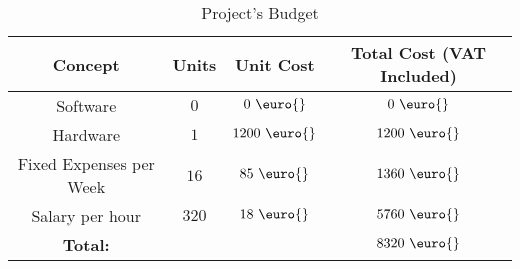         \begin{table}
            \centering
            \begin{tabular}{|c|c|c|c|}
                \hline
                \textbf{Concept} & \textbf{Units} & \textbf{Unit Cost} & \textbf{Total Cost (VAT Included)}\\
                \hline
                Software & $0$ & $0\ \text{\euro{}}$ & $0\ \text{\euro{}}$\\
                \hline
                Hardware & $1$ & $1200\ \text{\euro{}}$ & $1200\ \text{\euro{}}$\\
                \hline
                Fixed Expenses per Week & $16$ & $85\ \text{\euro{}}$ & $1360\ \text{\euro{}}$\\
                \hline
                Salary per hour & $320$ & $18\ \text{\euro{}}$ & $5760\ \text{\euro{}}$\\
                \hline
                \textbf{Total:} & & & $8320\ \text{\euro{}}$\\
                \hline
            \end{tabular}
            \caption{Project's Budget}
            \label{tab:budget}
        \end{table}
